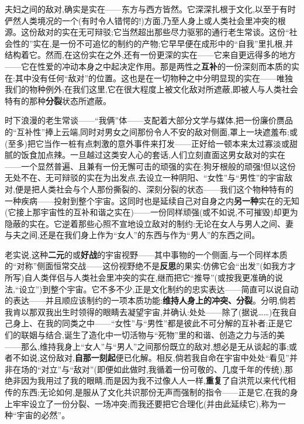 夫妇之间的敌对,确实是实在——东方与西方皆然。它深深扎根于文化,以至于有时俨然人类境况的一个(有时令人错愕的!)方面,乃至人身上或人类社会里冲突的根源。这份敌对的实在无可辩驳;它当然超出那些尽力驱邪的通行老生常谈。这份“社会性的”实在,是一份不可追忆的制约的产物;它早早便在成形中的“自我”里扎根,并结构着它。然而,在这份实在之外,还有一份更深的实在——它来自更远得多的地方——它在性爱的冲动本身之中起决定作用。那是两性之\textbf{互补}的一份深刻而本质的实在:其中没有任何“敌对”的位置。这也是在一切物种之中分明显现的实在——唯独我们的物种例外;在我们这里,它在很大程度上被文化敌对所遮蔽,即被人与人类社会特有的那种\textbf{分裂}状态所遮蔽。

时下浪漫的老生常谈——“我俩”体——支配着大部分文学与媒体,把一份廉价赝品的“互补性”捧上云端,同时对男女之间那份令人不安的敌对侧面,罩上一块遮羞布;或(至多)把它当作一桩有点刺激的意外事件来打发——正好给一顿本来太过寡淡或甜腻的饭食加点辣。一旦越过这类安人心的套话,人们立刻直面这男女敌对的实在——一个显然普遍、且兼有一份无懈可击的顽强的实在:狗牙根般的顽强!但以这份无处不在、无可辩驳的实在为出发点,去设立一种阴阳、“女性”与“男性”的宇宙敌对,便是把人类社会与个人那份撕裂的、深刻分裂的状态——我们这个物种特有的一种疾病——投射到整个宇宙。这同时也是延续自己对自身之内\textbf{另一种}实在的无知(它接上那宇宙性的互补和谐之实在)——一份同样顽强(或不如说,不可摧毁)却更为隐蔽的实在。它逆着那些心照不宣地设立敌对的制约:无论在女人与男人之间、妻与夫之间,还是在我们身上作为“女人”的东西与作为“男人”的东西之间。

老实说,这种\textbf{二元}的或\textbf{好战}的宇宙视野——其中事物的一个侧面,与一个同样本质的“对称”侧面恒常交战——这份视野绝不是\textbf{反思}的果实:仿佛它会“出发”(如我方才所写)自人类伴侣与人类社会里冲突的实在,继而把它“推导”(或按我更准确的说法,“设立”)到整个宇宙。它不多不少,正是文化制约的忠实表达——简直可以说自动的表达——并且顺应该制约的一项本质功能:\textbf{维持人身上的冲突、分裂}。分明,倘若我肯以那双我出生时领得的眼睛去凝望宇宙,并确认:处处——除了(据说……)在我自己身上、在我的同类之中——“女性”与“男性”都是彼此不可分解的互补者;正是它们的联姻与结合,诞生了造化中一切活物与“死物”里的和谐、创造之力与活的美——那么,维持我身上“女人”与“男人”之间那份既立的敌对,想必是无从谈起的事;或者不如说,这份敌对,\textbf{自那一刻起}便已化解。相反,倘若我自命在宇宙中处处“看见”并非在场的“对立”与“敌对”(即便如此做时,我循着一份可敬的、几度千年的传统),那绝非因为我用过了我的眼睛,而是因为我不过像人人一样,\textbf{重复}了自洪荒以来代代相传的东西;无论如何,是服从了文化共识那份无声而强制的指令——正是它,在我的身上牢牢设立了一份分裂、一场冲突;而我还要把它合理化(并由此延续它),称为一种“宇宙的必然”。

